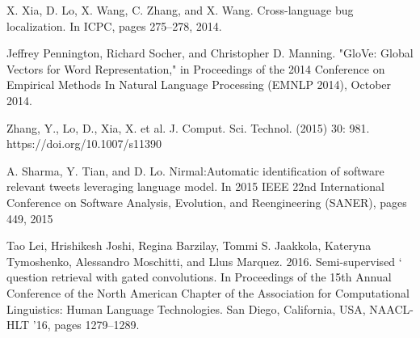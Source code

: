 \begin{thebibliography}{1}
X. Xia, D. Lo, X. Wang, C. Zhang, and X. Wang. Cross-language bug localization. In ICPC, pages 275–278, 2014.

Jeffrey Pennington, Richard Socher, and Christopher D. Manning. "GloVe: Global Vectors for Word Representation," in Proceedings of the 2014 Conference on Empirical Methods In Natural Language Processing (EMNLP 2014), October 2014. 

Zhang, Y., Lo, D., Xia, X. et al. J. Comput. Sci. Technol. (2015) 30: 981. https://doi.org/10.1007/s11390

 A. Sharma, Y. Tian, and D. Lo. Nirmal:Automatic identification of software relevant tweets leveraging language model.  In 2015 IEEE 22nd International Conference on Software Analysis, Evolution, and Reengineering (SANER), pages 449, 2015
 
Tao Lei, Hrishikesh Joshi, Regina Barzilay, Tommi S. Jaakkola, Kateryna Tymoshenko, Alessandro Moschitti, and Lluıs Marquez. 2016. Semi-supervised ` question retrieval with gated convolutions. In Proceedings of the 15th Annual Conference of the North American Chapter of the Association for Computational Linguistics: Human Language Technologies. San Diego, California, USA, NAACL-HLT ’16, pages 1279–1289.

\end{thebibliography}
